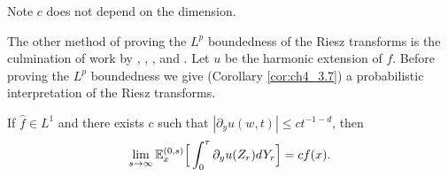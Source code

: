 Note $c$ does not depend on the dimension.
\vspace*{1\baselineskip}

The other method of proving the $L^p$ boundedness of the Riesz transforms is the culmination of work by \cite{GundySilverstein1982}, \cite{GundyVaropoulos1979}, \cite{Meyer1976,Meyer1981}, and \cite{Banuelos1986a,Banuelos1988}. Let $u$ be the harmonic extension of $f$. Before proving the $L^p$ boundedness we give (Corollary \ref{cor:ch4_3.7}) a probabilistic interpretation of the Riesz transforms.

\begin{proposition}\label{prop:ch4_3.6}
If $\widehat{f} \in L^1$ and there exists $c$ such that $|\partial_y u(w,t)| \leq ct^{-1-d}$, then
\[
    \lim_{s\to\infty} \mathbb{E}_x^{(0,s)}\Big[\int_0^{\tau} \partial_y u(Z_r)dY_r\Big] = cf(x).
\]
\end{proposition}

